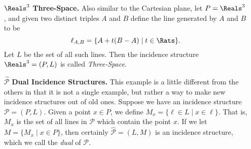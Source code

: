 \documentclass{article}
\begin{document}
\begin{itemize}
\item[$\Reals^3$] \textbf{Three-Space.} Also similar to the Cartesian plane, let $P = \Reals^3$, and given two distinct triples $A$ and $B$ define the line generated by $A$ and $B$ to be \[\ell_{A,B} = \{ A + t(B-A) \mid t \in \Rats \}. \] Let $L$ be the set of all such lines. Then the incidence structure $\Reals^3 = (P,L)$ is called \emph{Three-Space}.


\item[$\widehat{\mathcal{P}}$] \textbf{Dual Incidence Structures.} This example is a little different from the others in that it is not a single example, but rather a way to make new incidence structures out of old ones. Suppose we have an incidence structure $\mathcal{P} = (P,L)$. Given a point $x \in P$, we define $M_x = \{ \ell \in L \mid x \in \ell \}$. That is, $M_x$ is the set of all lines in $\mathcal{P}$ which contain the point $x$. If we let $M = \{ M_x \mid x \in P \}$, then certainly $\widehat{\mathcal{P}} = (L, M)$ is an incidence structure, which we call the \emph{dual} of $\mathcal{P}$.
\end{itemize}
\end{document}
